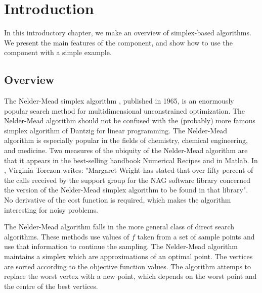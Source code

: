 \chapter{Introduction}

In this introductory chapter, we make an overview of simplex-based algorithms.
We present the main features of the  component, and 
show how to use the component with a simple example.

\section{Overview}

The Nelder-Mead simplex algorithm \cite{citeulike:3009487}, published in 1965, is an enormously 
popular search method for multidimensional unconstrained optimization. 
The Nelder-Mead algorithm should not be confused with the (probably) 
more famous simplex algorithm of Dantzig for linear programming. The 
Nelder-Mead algorithm is especially popular in the fields of chemistry, 
chemical engineering, and medicine. Two measures of the ubiquity of the 
Nelder-Mead algorithm are that it appears in the best-selling handbook 
Numerical Recipes and in Matlab. In \cite{Torczon89multi-directionalsearch},
Virginia Torczon writes: "Margaret Wright has stated that over
fifty percent of the calls received by the support group for the NAG
software library concerned the version of the Nelder-Mead 
simplex algorithm to be found in that library". No derivative of the cost function is 
required, which makes the algorithm interesting for noisy problems.

The Nelder-Mead algorithm falls in the more general class of direct 
search algorithms. These methods use values of $f$ taken from a set of 
sample points and use that information to continue the sampling. The 
Nelder-Mead algorithm maintains a simplex which are approximations of an 
optimal point. The vertices are sorted according to the objective 
function values. The algorithm attemps to replace the worst vertex with 
a new point, which depends on the worst point and the centre of the best 
vertices. 


